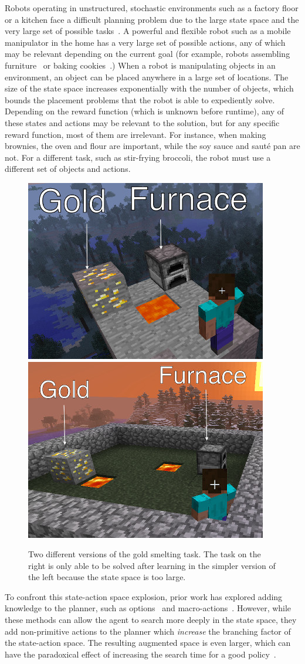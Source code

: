 Robots operating in unstructured, stochastic environments such as a
factory floor or a kitchen face a difficult planning problem due to
the large state space and the very large set of possible
tasks~\citep{bollini12,knepper13}.  A powerful and flexible robot such
as a mobile manipulator in the home has a very large set of possible
actions, any of which may be relevant depending on the current goal
(for example, robots assembling furniture~\citep{knepper13} or baking
cookies~\citep{bollini12}.)  When a robot is manipulating objects in
an environment, an object can be placed anywhere in a large set of
locations.  The size of the state space increases exponentially with
the number of objects, which bounds the placement problems that the
robot is able to expediently solve.  Depending on the reward function
(which is unknown before runtime), any of these states and actions may
be relevant to the solution, but for any specific reward function,
most of them are irrelevant.  For instance, when making brownies, the
oven and flour are important, while the soy sauce and saut\'{e} pan
are not.  For a different task, such as stir-frying broccoli, the
robot must use a different set of objects and
actions. 
\begin{figure}
\centering
\includegraphics[width=0.2\linewidth]{figures/smelt_small.jpg}
\includegraphics[width=0.2\linewidth]{figures/smelt_large.jpg}
\caption{Two different versions of the gold smelting task.
  The task on the right is only able to be solved after learning in the
  simpler version of the left because the state space is too large.
  \label{fig:example}}
\end{figure}

To confront this state-action space explosion, prior work has explored
adding knowledge to the planner, such as options~\cite{sutton99} and
macro-actions~\cite{Botea:2005kx,Newton:2005vn}.  However, while these
methods can allow the agent to search more deeply in the state space,
they add non-primitive actions to the planner which {\em increase} the
branching factor of the state-action space.  The resulting augmented
space is even larger, which can have the paradoxical effect of
increasing the search time for a good policy~\cite{Jong:2008zr}.

